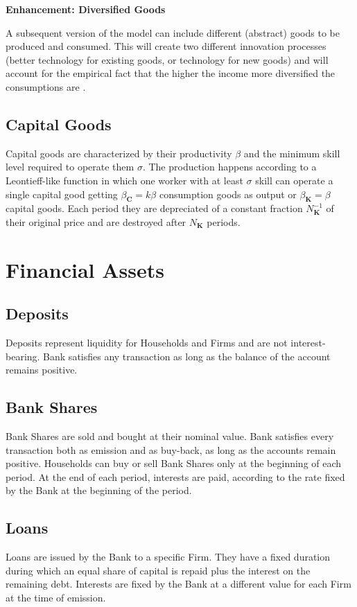 \documentclass[a4paper, headings=standardclasses]{scrartcl}
\newenvironment{enh}[1][]{\begin{framed}\noindent\textbf{Enhancement: #1}\par}{\end{framed}}
\begin{document}
\begin{enh}[Diversified Goods]
    A subsequent version of the model can include different (abstract) goods to be produced and consumed. This will create two different innovation processes (better technology for existing goods, or technology for new goods) and will account for the empirical fact that the higher the income more diversified the consumptions are \parencite[cfr.][§2]{didomenico2022}.
\end{enh}

\subsection{Capital Goods}
Capital goods are characterized by their productivity $\beta$ and the minimum skill level required to operate them $\sigma$. The production happens according to a Leontieff-like function in which one worker with at least $\sigma$ skill can operate a single capital good getting $\beta_\mathbf{C}=k \beta$ consumption goods as output or $\beta_\mathbf{K} = \beta$ capital goods. Each period they are depreciated of a constant fraction $N_\mathbf{K}^{-1}$ of their original price and are destroyed after $N_\mathbf{K}$ periods.

\section{Financial Assets}

\subsection{Deposits}
Deposits represent liquidity for Households and Firms and are not interest-bearing. Bank satisfies any transaction as long as the balance of the account remains positive.

\subsection{Bank Shares}
Bank Shares are sold and bought at their nominal value. Bank satisfies every transaction both as emission and as buy-back, as long as the accounts remain positive. Households can buy or sell Bank Shares only at the beginning of each period. At the end of each period, interests are paid, according to the rate fixed by the Bank at the beginning of the period.

\subsection{Loans}
Loans are issued by the Bank to a specific Firm. They have a fixed duration during which an equal share of capital is repaid plus the interest on the remaining debt. Interests are fixed by the Bank at a different value for each Firm at the time of emission.
\end{document}
